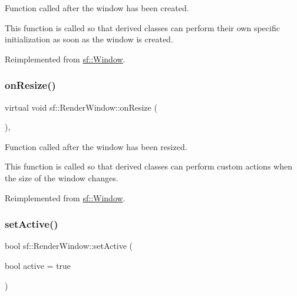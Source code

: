 Function called after the window has been created. 

This function is called so that derived classes can perform their own specific initialization as soon as the window is created. \begin{DoxyVerb}\end{DoxyVerb}
 

Reimplemented from \mbox{\hyperlink{classsf_1_1_window_a106633b9be49b27f83d4712689b493eb}{sf\+::\+Window}}.

\mbox{\label{classsf_1_1_render_window_a5c85fe482313562d33ffd24a194b6fef}} 
\subsubsection{\texorpdfstring{onResize()}{onResize()}}
{\footnotesize\ttfamily virtual void sf\+::\+Render\+Window\+::on\+Resize (\begin{DoxyParamCaption}{ }\end{DoxyParamCaption})\hspace{0.3cm}{\ttfamily [protected]}, {\ttfamily [virtual]}}



Function called after the window has been resized. 

This function is called so that derived classes can perform custom actions when the size of the window changes. \begin{DoxyVerb}\end{DoxyVerb}
 

Reimplemented from \mbox{\hyperlink{classsf_1_1_window_a10f567a387da7b49f417f73321fcf64d}{sf\+::\+Window}}.

\mbox{\label{classsf_1_1_render_window_aee6c53eced675e885931eb3e91f11155}} 
\subsubsection{\texorpdfstring{setActive()}{setActive()}}
{\footnotesize\ttfamily bool sf\+::\+Render\+Window\+::set\+Active (\begin{DoxyParamCaption}\item[{bool}]{active = {\ttfamily true} }\end{DoxyParamCaption})\hspace{0.3cm}{\ttfamily [virtual]}}



